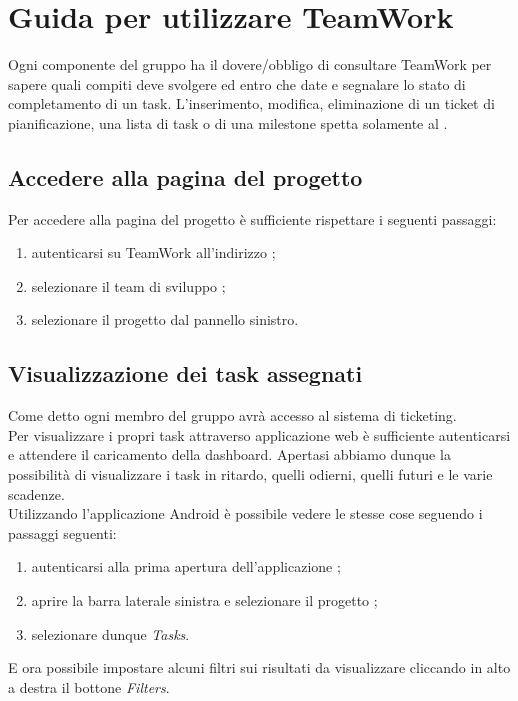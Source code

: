 \section{Guida per utilizzare TeamWork}
		Ogni componente del gruppo ha il dovere/obbligo di consultare TeamWork per sapere quali compiti deve svolgere ed entro che date e segnalare lo stato di completamento di un task. L'inserimento, modifica, eliminazione di un ticket di pianificazione, una lista di task o di una milestone spetta solamente al .
		\subsection{Accedere alla pagina del progetto}
			Per accedere alla pagina del progetto è sufficiente rispettare i seguenti passaggi:
			\begin{enumerate}
				\item autenticarsi su TeamWork all'indirizzo ;
				\item selezionare il team di sviluppo \groupname{};
				\item selezionare il progetto \projectname{} dal pannello sinistro.
			\end{enumerate}
			
		\subsection{Visualizzazione dei task assegnati}
			Come detto ogni membro del gruppo \groupname{} avrà accesso al sistema di ticketing.\\
			Per visualizzare i propri task attraverso applicazione web è sufficiente autenticarsi e attendere il caricamento della dashboard. Apertasi abbiamo dunque la possibilità di visualizzare i task in ritardo, quelli odierni, quelli futuri e le varie scadenze.\\
			
Utilizzando l'applicazione Android è possibile vedere le stesse cose seguendo i passaggi seguenti:
			\begin{enumerate}
				\item autenticarsi alla prima apertura dell'applicazione ;
				\item aprire la barra laterale sinistra e selezionare il progetto \projectname{};
				\item selezionare dunque \textit{Tasks}.
			\end{enumerate}
			E ora possibile impostare alcuni filtri sui risultati da visualizzare cliccando in alto a destra il bottone  \textit{Filters}.

